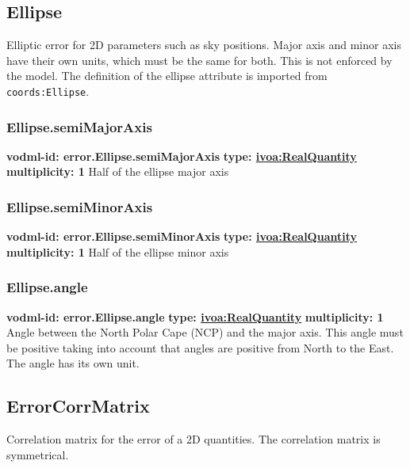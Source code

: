   \subsection{Ellipse}
    \label{sect:error.Ellipse}
    Elliptic error for 2D parameters such as sky positions. Major axis and minor axis have their own units, which must be the same for both. This is not enforced by the model. The definition of the ellipse attribute is imported from \texttt{coords:Ellipse}.

    \subsubsection{Ellipse.semiMajorAxis}
    \textbf{vodml-id: error.Ellipse.semiMajorAxis} \newline
    \textbf{type: \hyperref[sect:ivoa]{ivoa:RealQuantity}} \newline
    \textbf{multiplicity: 1} \newline
    Half of the ellipse major axis

    \subsubsection{Ellipse.semiMinorAxis}
    \textbf{vodml-id: error.Ellipse.semiMinorAxis} \newline
    \textbf{type: \hyperref[sect:ivoa]{ivoa:RealQuantity}} \newline
    \textbf{multiplicity: 1} \newline
    Half of the ellipse minor axis

    \subsubsection{Ellipse.angle}
    \textbf{vodml-id: error.Ellipse.angle} \newline
    \textbf{type: \hyperref[sect:ivoa]{ivoa:RealQuantity}} \newline
    \textbf{multiplicity: 1} \newline
    Angle between the North Polar Cape (NCP) and the major axis. This angle must be positive taking into account that angles are positive from North to the East. The angle has its own unit.

  \subsection{ErrorCorrMatrix}
    \label{sect:error.ErrorCorrMatrix}
    Correlation matrix for the error of a 2D quantities. The correlation matrix is symmetrical.

